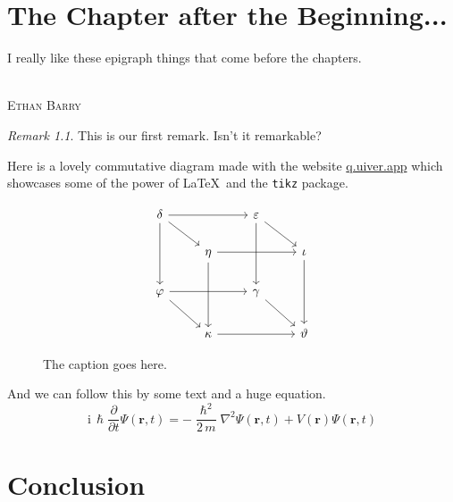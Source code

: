 \documentclass[letterpaper,
               extrafontsizes,
               11pt,
               oneside,
               final]{memoir}   %
\theoremstyle{plain}                        %
\theoremstyle{definition}
\theoremstyle{remark}
\newtheorem{rem}{Remark}
\newcommand{\MarginNote}[1]{
  \marginpar{\footnotesize\itshape\raggedright #1}
}
\begin{document}
 \chapter{The Chapter after the Beginning...}
 \epigraph{I really like these epigraph things that come before the chapters.} {\\\textsc{Ethan Barry}}
 \lipsum[11]\MarginNote{\lipsum[11]}
 \begin{rem}
  This is our first remark. Isn't it remarkable?
 \end{rem}
 Here is a lovely commutative diagram made with
 the website \href{https://q.uiver.app}{q.uiver.app} which showcases some of the power of \LaTeX\,
 and the \verb|tikz| package.
 \begin{figure}[h!]
   \[
   \begin{tikzcd}
    \delta && \varepsilon \\
    & \eta && \iota \\
    \varphi && \gamma \\
    & \kappa && \vartheta
    \arrow[from=1-1, to=1-3]
    \arrow[from=1-1, to=2-2]
    \arrow[from=1-1, to=3-1]
    \arrow[from=1-3, to=2-4]
    \arrow[from=1-3, to=3-3]
    \arrow[from=2-2, to=2-4]
    \arrow[from=2-2, to=4-2]
    \arrow[from=2-4, to=4-4]
    \arrow[from=3-1, to=3-3]
    \arrow[from=3-1, to=4-2]
    \arrow[from=3-3, to=4-4]
    \arrow[from=4-2, to=4-4]
   \end{tikzcd}
   \]
   \caption{The caption goes here.}
 \end{figure}


 And we can follow this by some text and a huge equation. \lipsum[12]
 \begin{equation*}
    \mathrm{i}\,\hslash\frac{\partial}{\partial t} \Psi(\mathbf{r},t) = -\frac{\hslash^2}{2\,m}\nabla^2\Psi(\mathbf{r},t) + V(\mathbf{r})\Psi(\mathbf{r},t)
\end{equation*}

\chapter*{Conclusion}
\lipsum[13]
\end{document}
